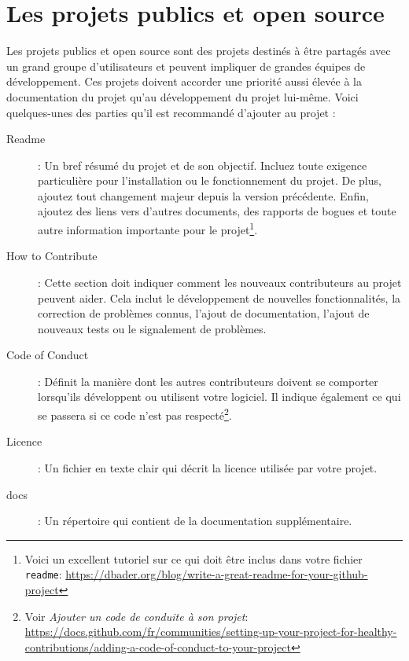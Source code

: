 \documentclass[a4paper,11pt]{book}
\begin{document}
\section{Les projets publics et open source}
Les projets publics et open source sont des projets destinés à être partagés avec un grand groupe d'utilisateurs et peuvent impliquer de grandes équipes de développement. Ces projets doivent accorder une priorité aussi élevée à la documentation du projet qu'au développement du projet lui-même. Voici quelques-unes des parties qu'il est recommandé d'ajouter au projet :
\begin{description}
	\item[Readme] : Un bref résumé du projet et de son objectif. Incluez toute exigence particulière pour l'installation ou le fonctionnement du projet. De plus, ajoutez tout changement majeur depuis la version précédente. Enfin, ajoutez des liens vers d'autres documents, des rapports de bogues et toute autre information importante pour le projet\footnote{Voici un excellent tutoriel sur ce qui doit être inclus dans votre fichier \texttt{readme}:  \url{https://dbader.org/blog/write-a-great-readme-for-your-github-project}}.
	\item[How to Contribute]: Cette section doit indiquer comment les nouveaux contributeurs au projet peuvent aider. Cela inclut le développement de nouvelles fonctionnalités, la correction de problèmes connus, l'ajout de documentation, l'ajout de nouveaux tests ou le signalement de problèmes.
	\item[Code of Conduct]: Définit la manière dont les autres contributeurs doivent se comporter lorsqu'ils développent ou utilisent votre logiciel. Il indique également ce qui se passera si ce code n'est pas respecté\footnote{Voir \textit{Ajouter un code de conduite à son projet}: \url{https://docs.github.com/fr/communities/setting-up-your-project-for-healthy-contributions/adding-a-code-of-conduct-to-your-project}}.
	\item[Licence]: Un fichier en texte clair qui décrit la licence utilisée par votre projet. 
	\item[docs] : Un répertoire qui contient de la documentation supplémentaire.
\end{description}
\medskip
\end{document}
